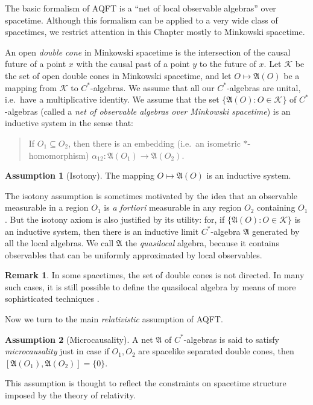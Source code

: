 \documentclass[11pt]{article}
\newcommand{\alg}[1]{\mathfrak{#1}}
\theoremstyle{definition}
\newtheorem{assumption}{Assumption}
\theoremstyle{definition}
\newtheorem{note}[thm]{Remark}
\theoremstyle{remark}
\def\2#1{{\mathcal #1}}
\def\al#1{{\mathfrak #1}}
\def\a{\alpha} \def\b{\beta} \def\g{\gamma} \def\d{\delta}
\begin{document}
The basic formalism of AQFT is a ``net of local observable algebras''
over spacetime.  Although this formalism can be applied to a very wide
class of spacetimes, we restrict attention in this Chapter mostly to
Minkowski spacetime.

An open \emph{double cone} in Minkowski spacetime is the intersection
of the causal future of a point $x$ with the causal past of a point
$y$ to the future of $x$.  Let $\2K$ be the set of open double cones
in Minkowski spacetime, and let $O\mapsto \alg{A}(O)$ be a mapping
from $\2K$ to $C^*$-algebras.  We assume that all our $C^*$-algebras
are unital, i.e.\ have a multiplicative identity.  We assume that the
set $\{ \alg{A}(O):O\in \2K \}$ of $C^*$-algebras (called a \emph{net
  of observable algebras over Minkowski spacetime}) is an inductive
system in the sense that:

\begin{quote} If $O_1\subseteq O_2$, then there is an embedding (i.e.\
  an isometric $*$-homomorphism) ${\a _{12}:\alg{A}(O_1)\to
  \alg{A}(O_2)}$.  \end{quote}

\begin{assumption}[Isotony] The mapping $O\mapsto \al A (O)$ is an
  inductive system.  \end{assumption}

The isotony assumption is sometimes motivated by the idea that an
observable measurable in a region $O_1$ is \emph{a fortiori}
measurable in any region $O_2$ containing $O_1$.  But the isotony
axiom is also justified by its utility: for, if $\{ \alg{A}(O):O\in
\2K \}$ is an inductive system, then there is an inductive limit
$C^{*}$-algebra $\alg{A}$ generated by all the local algebras.  We
call $\alg{A}$ the \emph{quasilocal} algebra, because it contains
observables that can be uniformly approximated by local observables.

\begin{note} In some spacetimes, the set of double cones is not
  directed.  In many such cases, it is still possible to define the
  quasilocal algebra by means of more sophisticated techniques
  \cite{glob}.
\end{note}

Now we turn to the main \emph{relativistic} assumption of AQFT.
\begin{assumption}[Microcausality] A net $\alg{A}$ of $C^*$-algebras
  is said to satisfy \emph{microcausality} just in case if $O_1,O_2$
  are spacelike separated double cones, then
  $[\alg{A}(O_1),\alg{A}(O_2)]=\{ 0\}$.
  \label{micro}
\end{assumption}
This assumption is thought to reflect the constraints on spacetime structure imposed
by the theory of relativity.  
\end{document}
